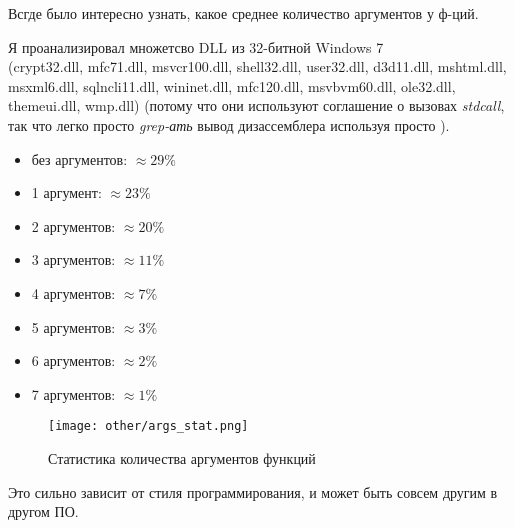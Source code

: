 \label{args_stat}

Всгде было интересно узнать, какое среднее количество аргументов у ф-ций.

Я проанализировал множетсво DLL из 32-битной Windows 7 \\
(crypt32.dll, mfc71.dll, msvcr100.dll, shell32.dll, 
user32.dll, d3d11.dll, mshtml.dll, msxml6.dll, sqlncli11.dll, wininet.dll, mfc120.dll, msvbvm60.dll, ole32.dll, themeui.dll, wmp.dll) 
(потому что они используют соглашение о вызовах \emph{stdcall}, так что легко просто \emph{grep-ать} вывод дизассемблера используя
просто ).

\begin{itemize}
\item без аргументов: $\approx 29\%$
\item 1 аргумент: $\approx 23\%$
\item 2 аргументов: $\approx 20\%$
\item 3 аргументов: $\approx 11\%$
\item 4 аргументов: $\approx 7\%$
\item 5 аргументов: $\approx 3\%$
\item 6 аргументов: $\approx 2\%$
\item 7 аргументов: $\approx 1\%$
\end{itemize}

\begin{figure}[H]
\centering
\texttt{[image: other/args\_stat.png]}
\caption{Статистика количества аргументов функций}
\end{figure}

Это сильно зависит от стиля программирования, и может быть совсем другим в другом ПО.

